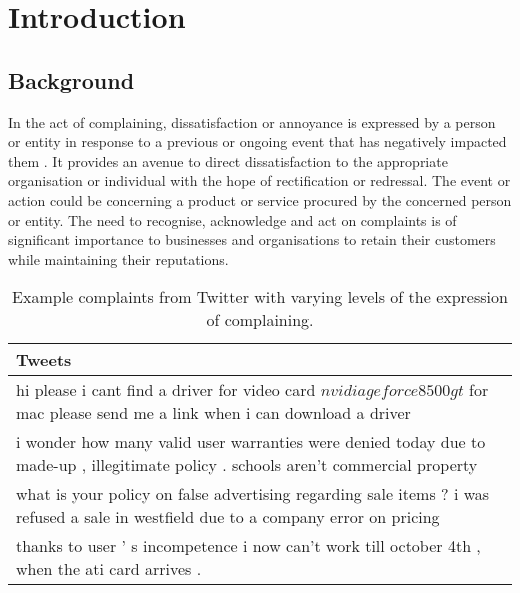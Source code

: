 \chapter{Introduction}

\section{Background}
In the act of complaining, dissatisfaction or annoyance is expressed by a person or entity in response to a previous or ongoing event that has negatively impacted them \cite{olshtain_speechact_1987}. It provides an avenue to direct dissatisfaction to the appropriate organisation or individual with the hope of rectification or redressal. The event or action could be concerning a product or service procured by the concerned person or entity. The need to recognise, acknowledge and act on complaints is of significant importance to businesses and organisations to retain their customers while maintaining their reputations.

\begin{table}[ht]
    \centering
    \begin{tabularx}{\textwidth}{|X|}
        \hline
        \rowcolor[gray]{0.7}
        \textbf{Tweets} \\
        \hline
        hi please i cant find a driver for video card \( nvidia geforce 8500 gt \) for mac please send me a link when i can download a driver \\
        \hline   
        i wonder how many valid \<user\> warranties were denied today due to made-up , illegitimate policy . schools aren't commercial property  \\
        \hline                        
        what is your policy on false advertising regarding sale items ? i was refused a sale in westfield due to a company error on pricing \\
        \hline
        thanks to \<user\> ' s incompetence i now can't work till october 4th , when the ati card arrives . \\
        \hline    
    \end{tabularx}
    \caption{Example complaints from Twitter with varying levels of the expression of complaining.}    
    \label{tab: ex_complaints}
\end{table}  


